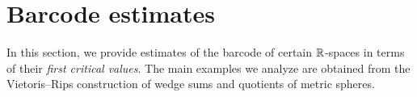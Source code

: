 
\section{Barcode estimates}\label{s:computations}

In this section, we provide estimates of the barcode of certain $\mathbb{R}$-spaces in terms of their \textit{first critical values}. 
The main examples we analyze are obtained from the Vietoris--Rips construction of wedge sums and quotients of metric spheres.





